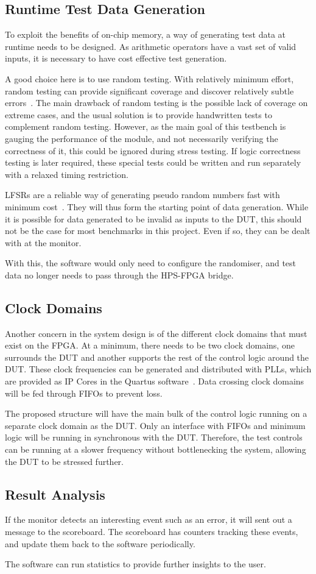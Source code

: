 \subsection{Runtime Test Data Generation}
To exploit the benefits of on-chip memory, a way of generating test data
at runtime needs to be designed.
As arithmetic operators have a vast set of valid inputs, it is necessary to
have cost effective test generation.

A good choice here is to use random testing.
With relatively minimum effort, random testing can provide significant coverage
and discover relatively subtle errors~\cite{Duran1}.
The main drawback of random testing is the possible lack of coverage on extreme
cases, and the usual solution is to provide handwritten tests to complement
random testing.
However, as the main goal of this testbench is gauging the performance of
the module, and not necessarily verifying the correctness of it,
this could be ignored during stress testing.
If logic correctness testing is later required, these special tests could be
written and run separately with a relaxed timing restriction.

LFSRs are a reliable way of generating pseudo random numbers fast with minimum
cost~\cite{Hazwani1}.
They will thus form the starting point of data generation.
While it is possible for data generated to be invalid as inputs to the DUT, this
should not be the case for most benchmarks in this project.
Even if so, they can be dealt with at the monitor.

With this, the software would only need to configure the randomiser, and test
data no longer needs to pass through the HPS-FPGA bridge.

\subsection{Clock Domains}
Another concern in the system design is of the different clock domains that
must exist on the FPGA.
At a minimum, there needs to be two clock domains, one surrounds the DUT and
another supports the rest of the control logic around the DUT.
These clock frequencies can be generated and distributed with PLLs, which are
provided as IP Cores in the Quartus software~\cite{Altera4}.
Data crossing clock domains will be fed through FIFOs to prevent loss.

The proposed structure will have the main bulk of the control logic running
on a separate clock domain as the DUT.
Only an interface with FIFOs and minimum logic will be running in synchronous
with the DUT.
Therefore, the test controls can be running at a slower frequency without
bottlenecking the system, allowing the DUT to be stressed further.

\subsection{Result Analysis}
If the monitor detects an interesting event such as an error, it will sent out
a message to the scoreboard.
The scoreboard has counters tracking these events, and update them back to the
software periodically.

The software can run statistics to provide further insights to the user.